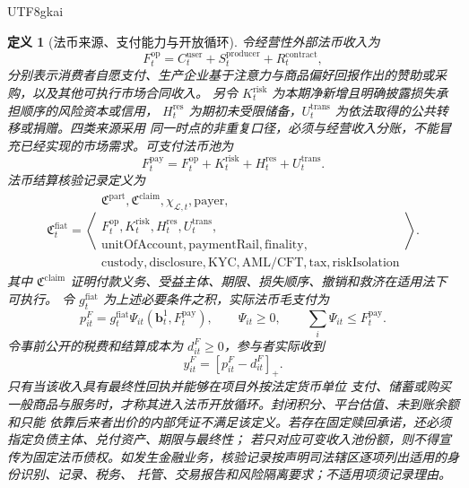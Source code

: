 \documentclass[12pt,a4paper,openany]{report}
\newtheorem{definition}{定义}[chapter]
\begin{document}
\begin{CJK*}{UTF8}{gkai}
\begin{definition}[法币来源、支付能力与开放循环]
\label{def:fiat-source-open-cycle}
令经营性外部法币收入为
\[
  F_t^{\mathrm{op}}
  =C_t^{\mathrm{user}}+S_t^{\mathrm{producer}}+R_t^{\mathrm{contract}},
\]
分别表示消费者自愿支付、生产企业基于注意力与商品偏好回报作出的赞助或采购，以及其他可执行市场合同收入。
另令 \(K_t^{\mathrm{risk}}\) 为本期净新增且明确披露损失承担顺序的风险资本或信用，
\(H_t^{\mathrm{res}}\) 为期初未受限储备，\(U_t^{\mathrm{trans}}\) 为依法取得的公共转移或捐赠。四类来源采用
同一时点的非重复口径，必须与经营收入分账，不能冒充已经实现的市场需求。可支付法币池为
\[
  F_t^{\mathrm{pay}}
  =F_t^{\mathrm{op}}+K_t^{\mathrm{risk}}+H_t^{\mathrm{res}}+U_t^{\mathrm{trans}}.
\]
法币结算核验记录定义为
\[
  \mathfrak C_t^{\mathrm{fiat}}
  =\left\langle
  \begin{gathered}
  \mathfrak C^{\mathrm{part}},\mathfrak C^{\mathrm{claim}},
  \chi_{\mathcal L,t},\mathrm{payer},\\
  F_t^{\mathrm{op}},K_t^{\mathrm{risk}},H_t^{\mathrm{res}},U_t^{\mathrm{trans}},\\
  \mathrm{unitOfAccount},\mathrm{paymentRail},\mathrm{finality},\\
  \mathrm{custody},\mathrm{disclosure},\mathrm{KYC},
  \mathrm{AML/CFT},\mathrm{tax},\mathrm{riskIsolation}
  \end{gathered}
  \right\rangle.
\]
其中 \(\mathfrak C^{\mathrm{claim}}\) 证明付款义务、受益主体、期限、损失顺序、撤销和救济在适用法下可执行。
令 \(g_t^{\mathrm{fiat}}\) 为上述必要条件之积，实际法币毛支付为
\[
  p_{it}^{F}=g_t^{\mathrm{fiat}}\Psi_{it}(\mathbf b_t^1,F_t^{\mathrm{pay}}),
  \qquad
  \Psi_{it}\ge0,
  \qquad
  \sum_i\Psi_{it}\le F_t^{\mathrm{pay}}.
\]
令事前公开的税费和结算成本为 \(d_{it}^{F}\ge0\)，参与者实际收到
\[
  y_{it}^{F}=[p_{it}^{F}-d_{it}^{F}]_+.
\]
只有当该收入具有最终性回执并能够在项目外按法定货币单位
支付、储蓄或购买一般商品与服务时，才称其进入\emph{法币开放循环}。封闭积分、平台估值、未到账余额和只能
依靠后来者出价的内部凭证不满足该定义。若存在固定赎回承诺，还必须指定负债主体、兑付资产、期限与最终性；
若只对应可变收入池份额，则不得宣传为固定法币债权。如发生金融业务，核验记录按声明司法辖区逐项列出适用的身份识别、记录、税务、
托管、交易报告和风险隔离要求；不适用项须记录理由。
\end{definition}


\end{CJK*}
\end{document}

